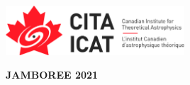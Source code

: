 \documentclass[11pt,letterpaper]{article}
\begin{document}
\begin{multicols}{2}
\null\vfill
\includegraphics[width=0.5\textwidth]{header/CITA_FullColour_Horizontal}
\vfill\null
\columnbreak
\null\vfill
\begin{center}
  {\bf\huge JAMBOREE 2021}
\end{center}
\vfill\null
\end{multicols}
\end{document}
